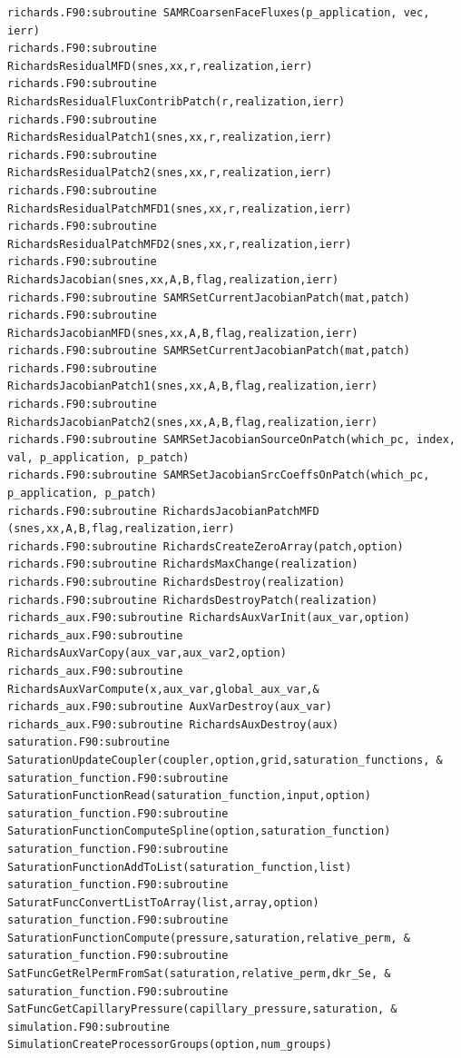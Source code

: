 \documentclass[12pt]{article}
\begin{document}
\begin{verbatim}
richards.F90:subroutine SAMRCoarsenFaceFluxes(p_application, vec, ierr)
richards.F90:subroutine RichardsResidualMFD(snes,xx,r,realization,ierr)
richards.F90:subroutine RichardsResidualFluxContribPatch(r,realization,ierr)
richards.F90:subroutine RichardsResidualPatch1(snes,xx,r,realization,ierr)
richards.F90:subroutine RichardsResidualPatch2(snes,xx,r,realization,ierr)
richards.F90:subroutine RichardsResidualPatchMFD1(snes,xx,r,realization,ierr)
richards.F90:subroutine RichardsResidualPatchMFD2(snes,xx,r,realization,ierr)
richards.F90:subroutine RichardsJacobian(snes,xx,A,B,flag,realization,ierr)
richards.F90:subroutine SAMRSetCurrentJacobianPatch(mat,patch) 
richards.F90:subroutine RichardsJacobianMFD(snes,xx,A,B,flag,realization,ierr)
richards.F90:subroutine SAMRSetCurrentJacobianPatch(mat,patch) 
richards.F90:subroutine RichardsJacobianPatch1(snes,xx,A,B,flag,realization,ierr)
richards.F90:subroutine RichardsJacobianPatch2(snes,xx,A,B,flag,realization,ierr)
richards.F90:subroutine SAMRSetJacobianSourceOnPatch(which_pc, index, val, p_application, p_patch) 
richards.F90:subroutine SAMRSetJacobianSrcCoeffsOnPatch(which_pc, p_application, p_patch) 
richards.F90:subroutine RichardsJacobianPatchMFD (snes,xx,A,B,flag,realization,ierr)
richards.F90:subroutine RichardsCreateZeroArray(patch,option)
richards.F90:subroutine RichardsMaxChange(realization)
richards.F90:subroutine RichardsDestroy(realization)
richards.F90:subroutine RichardsDestroyPatch(realization)
richards_aux.F90:subroutine RichardsAuxVarInit(aux_var,option)
richards_aux.F90:subroutine RichardsAuxVarCopy(aux_var,aux_var2,option)
richards_aux.F90:subroutine RichardsAuxVarCompute(x,aux_var,global_aux_var,&
richards_aux.F90:subroutine AuxVarDestroy(aux_var)
richards_aux.F90:subroutine RichardsAuxDestroy(aux)
saturation.F90:subroutine SaturationUpdateCoupler(coupler,option,grid,saturation_functions, &
saturation_function.F90:subroutine SaturationFunctionRead(saturation_function,input,option)
saturation_function.F90:subroutine SaturationFunctionComputeSpline(option,saturation_function)
saturation_function.F90:subroutine SaturationFunctionAddToList(saturation_function,list)
saturation_function.F90:subroutine SaturatFuncConvertListToArray(list,array,option)
saturation_function.F90:subroutine SaturationFunctionCompute(pressure,saturation,relative_perm, &
saturation_function.F90:subroutine SatFuncGetRelPermFromSat(saturation,relative_perm,dkr_Se, &
saturation_function.F90:subroutine SatFuncGetCapillaryPressure(capillary_pressure,saturation, &
simulation.F90:subroutine SimulationCreateProcessorGroups(option,num_groups)

\end{verbatim}
\end{document}
